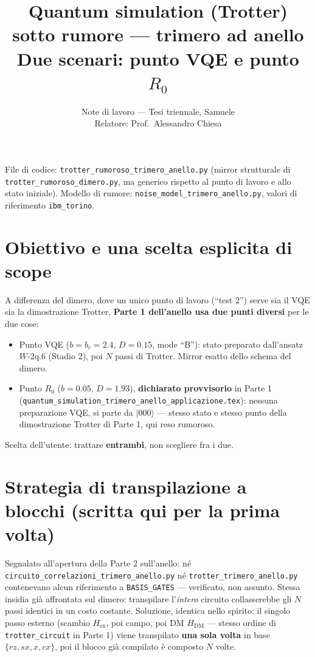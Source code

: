 \documentclass[11pt,a4paper]{article}
\title{\vspace{-1.5em}\color{inkblue}Quantum simulation (Trotter) sotto rumore --- trimero ad anello\\[0.2em]
\Large\normalfont\color{softgray}Due scenari: punto VQE e punto $R_0$}
\author{Note di lavoro --- Tesi triennale, Samuele\\ Relatore: Prof.\ Alessandro Chiesa}
\date{}
\newcommand{\ket}[1]{\lvert #1 \rangle}
\begin{document}
\sloppy
\maketitle
\thispagestyle{fancy}
\vspace{-2.0em}

File di codice:
\texttt{trotter\_\allowbreak rumoroso\_trimero\_anello.py} (mirror
strutturale di \texttt{trotter\_rumoroso\_dimero.py}, ma generico rispetto
al punto di lavoro e allo stato iniziale). Modello di rumore:
\texttt{noise\_model\_trimero\_anello.py}, valori di riferimento
\texttt{ibm\_torino}.

\tableofcontents

\section{Obiettivo e una scelta esplicita di scope}

A differenza del dimero, dove un unico punto di lavoro (``test 2'')
serve sia il VQE sia la dimostrazione Trotter, \textbf{Parte 1
dell'anello usa due punti diversi} per le due cose:

\begin{keyeq}[title={Due scenari, entrambi trattati qui}]
\begin{itemize}[leftmargin=1.3em,itemsep=0.2em]
\item[\textbf{A}] Punto VQE ($b=b_c=2.4,\,D=0.15$, mode ``B''): stato
preparato dall'ansatz $W$-2q.6 (Stadio 2), poi $N$ passi di Trotter.
Mirror esatto dello schema del dimero.
\item[\textbf{B}] Punto $R_0$ ($b=0.05,\,D=1.93$), \textbf{dichiarato
provvisorio} in Parte 1
(\texttt{quantum\_\allowbreak simulation\_\allowbreak trimero\_anello\_\allowbreak applicazione.tex}):
nessuna preparazione VQE, si parte da $\ket{000}$ --- stesso stato e
stesso punto della dimostrazione Trotter di Parte 1, qui reso rumoroso.
\end{itemize}
Scelta dell'utente: trattare \textbf{entrambi}, non scegliere fra i due.
\end{keyeq}

\section{Strategia di transpilazione a blocchi (scritta qui per la prima volta)}

Segnalato all'apertura della Parte 2 sull'anello: né
\texttt{circuito\_\allowbreak correlazioni\_\allowbreak trimero\_anello.py}
né \texttt{trotter\_trimero\_anello.py} contenevano alcun riferimento a
\texttt{BASIS\_GATES} --- verificato, non assunto. Stessa insidia già
affrontata sul dimero: transpilare l'\emph{intero} circuito collasserebbe
gli $N$ passi identici in un costo costante. Soluzione, identica nello
spirito: il singolo passo esterno (scambio $H_\text{ex}$, poi campo, poi
DM $H_\text{DM}$ --- stesso ordine di \texttt{trotter\_circuit} in Parte
1) viene transpilato \textbf{una sola volta} in base $\{rz,sx,x,cx\}$,
poi il blocco già compilato è composto $N$ volte.
\end{document}
